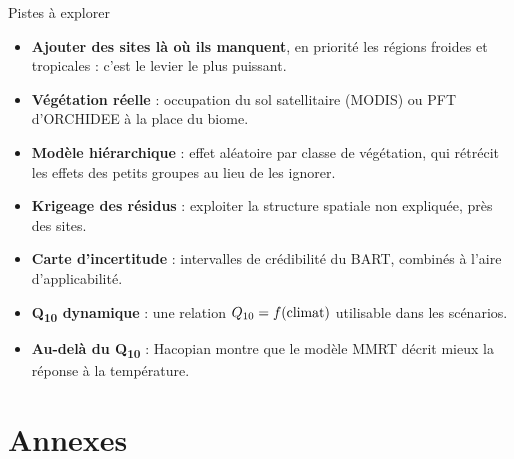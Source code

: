 \documentclass[aspectratio=169,10pt]{beamer}
\newcommand{\Qdix}{Q\textsubscript{10}}
\begin{document}
\begin{frame}{Pistes à explorer}
  \small
  \begin{itemize}
    \item \textbf{Ajouter des sites là où ils manquent}, en priorité les régions froides et tropicales : c'est le levier le plus puissant.
    \item \textbf{Végétation réelle} : occupation du sol satellitaire (MODIS) ou PFT d'ORCHIDEE à la place du biome.
    \item \textbf{Modèle hiérarchique} : effet aléatoire par classe de végétation, qui rétrécit les effets des petits groupes au lieu de les ignorer.
    \item \textbf{Krigeage des résidus} : exploiter la structure spatiale non expliquée, près des sites.
    \item \textbf{Carte d'incertitude} : intervalles de crédibilité du BART, combinés à l'aire d'applicabilité.
    \item \textbf{\Qdix{} dynamique} : une relation $\Qdix = f(\text{climat})$ utilisable dans les scénarios.
    \item \textbf{Au-delà du \Qdix{}} : Hacopian montre que le modèle MMRT décrit mieux la réponse à la température.
  \end{itemize}
\end{frame}

\appendix
\section{Annexes}
\end{document}
